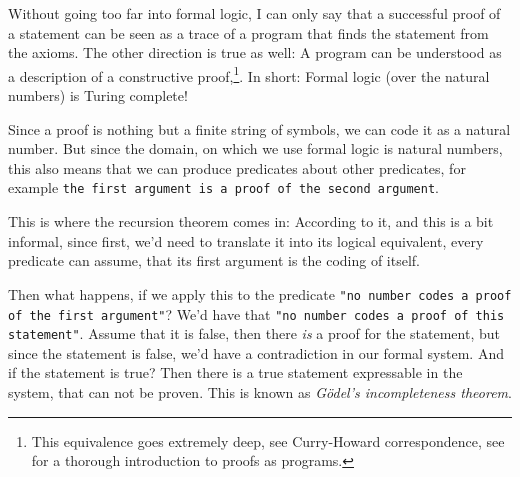 Without going too far into formal logic, I can only say that a successful proof
of a statement can be seen as a trace of a program that finds the statement
from the axioms. The other direction is true as well: A program can be
understood as a description of a constructive proof,\footnote{This equivalence
	goes extremely deep, see Curry-Howard correspondence, see
	\cite{girard1989proofs} for a thorough introduction to proofs as programs.}.
	In short: Formal logic (over the natural numbers) is Turing complete!

Since a proof is nothing but a finite string of symbols, we can code it as a
natural number. But since the domain, on which we use formal logic is natural
numbers, this also means that we can produce predicates about other predicates,
for example {\tt the first argument is a proof of the second argument}.

This is where the recursion theorem comes in: According to it, and this is a 
bit informal, since first, we'd need to translate it into its logical 
equivalent, every predicate can assume, that its first argument is the coding 
of itself.

Then what happens, if we apply this to the predicate {\tt "no number codes a proof 
of the first argument"}? We'd have that {\tt "no number codes a proof of this
statement"}. Assume that it is false, then there {\em is}\/ a proof for the 
statement, but since the statement is false, we'd have a contradiction in our 
formal system. And if the statement is true? Then there is a true statement 
expressable in the system, that can not be proven. This is known as {\em Gödel's 
incompleteness theorem}. 
